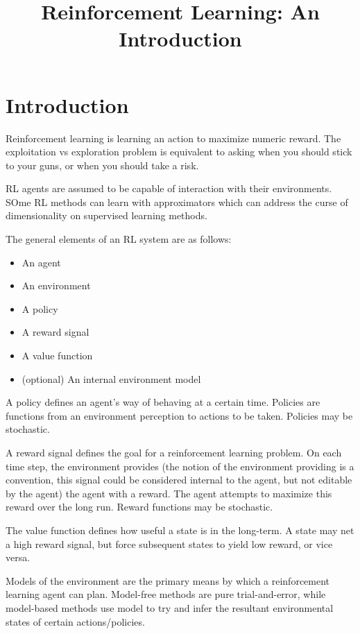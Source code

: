 \documentclass[a4paper]{report}
\title{Reinforcement Learning: An Introduction}
\begin{document}
\maketitle
\tableofcontents{}

\chapter{Introduction}

Reinforcement learning is learning an action to maximize numeric reward. The exploitation vs exploration problem is equivalent to asking when you should stick to your guns, or when you should take a risk.

RL agents are assumed to be capable of interaction with their environments. SOme RL methods can learn with approximators which can address the curse of dimensionality on supervised learning methods.

The general elements of an RL system are as follows:

\begin{itemize}
  \item An agent
  \item An environment
  \item A policy
  \item A reward signal
  \item A value function
  \item (optional) An internal environment model
\end{itemize}

A policy defines an agent’s way of behaving at a certain time. Policies are functions from an environment perception to actions to be taken. Policies may be stochastic.

A reward signal defines the goal for a reinforcement learning problem. On each time step, the environment provides (the notion of the environment providing is a convention, this signal could be considered internal to the agent, but not editable by the agent) the agent with a reward. The agent attempts to maximize this reward over the long run. Reward functions may be stochastic.

The value function defines how useful a state is in the long-term. A state may net a high reward signal, but force subsequent states to yield low reward, or vice versa.

Models of the environment are the primary means by which a reinforcement learning  agent can plan. Model-free methods are pure trial-and-error, while model-based methods use model to try and infer the resultant environmental states of certain actions/policies.
\end{document}
